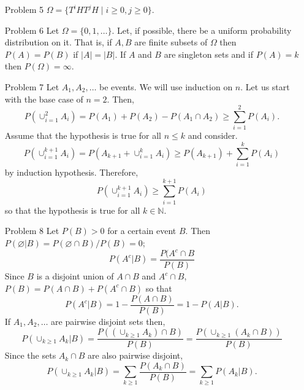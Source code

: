 \documentclass{article}
\newcommand{\son}{\mathbb{N}}
\begin{document}
\begin{enumerate}
\item[Problem 5] $\Omega = \{T^i H T^j H\;|\; i \ge 0, j \ge 0\}$.

\item[Problem 6] Let $\Omega = \{0, 1, \ldots\}$. Let, if possible, there be a 
uniform probability distribution on it. That is, if $A, B$ are finite subsets of
$\Omega$ then $P(A) = P(B)$ if $|A| = |B|$. If $A$ and $B$ are singleton sets 
and if $P(A) = k$ then $P(\Omega) = \infty$. 

\item[Problem 7] Let $A_1, A_2, \ldots$ be events. We will use induction on $n$.
Let us start with the base case of $n = 2$. Then,
\[
P(\cup_{i=1}^2 A_i) = P(A_1) + P(A_2) - P(A_1 \cap A_2) \ge \sum_{i=1}^2 P(A_i).
\]
Assume that the hypothesis is true for all $n \le k$ and consider.
\[
P(\cup_{i=1}^{k+1} A_i) = P(A_{k+1} + \cup_{i=1}^k A_i) \ge P(A_{k+1}) + 
\sum_{i=1}^k P(A_i)
\]
by induction hypothesis. Therefore,
\[
P(\cup_{i=1}^{k+1} A_i) \ge \sum_{i=1}^{k+1} P(A_i)
\]
so that the hypothesis is true for all $k \in \son$.

\item[Problem 8] Let $P(B) > 0$ for a certain event $B$. Then $P(\varnothing|B)
= P(\varnothing \cap B)/P(B) = 0$; 
\[
P(A^c|B) = \frac{P(A^c \cap B}{P(B)}
\]
Since $B$ is a disjoint union of $A \cap B$ and $A^c \cap B$, $P(B) = P(A \cap B)
+ P(A^c \cap B)$ so that
\[
P(A^c|B) = 1 - \frac{P(A \cap B)}{P(B)} = 1 - P(A|B).
\]
If $A_1, A_2, \ldots$ are pairwise disjoint sets then,
\[
P(\cup_{k \ge 1}A_k | B) = \frac{P((\cup_{k\ge 1} A_k) \cap B)}{P(B)}
= \frac{P(\cup_{k\ge 1} (A_k \cap B))}{P(B)}
\]
Since the sets $A_k \cap B$ are also pairwise disjoint,
\[
P(\cup_{k \ge 1}A_k | B) = \sum_{k \ge 1}\frac{P(A_k \cap B)}{P(B)} = 
\sum_{k \ge 1}P(A_k | B).
\]
\end{enumerate}
\end{document}
